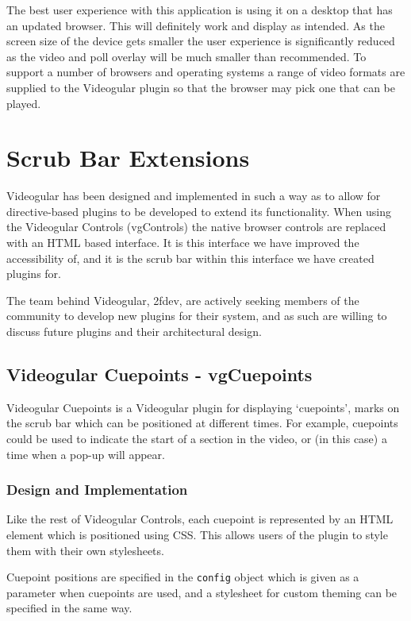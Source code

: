 The best user experience with this application is using it on a desktop that has an updated browser. This will definitely work and display as intended. As the screen size of the device gets smaller the user experience is significantly reduced as the video and poll overlay will be much smaller than recommended. To support a number of browsers and operating systems a range of video formats are supplied to the \gls{Videogular} plugin so that the browser may pick one that can be played.

\section{Scrub Bar Extensions}
\label{Section:Scrub Bar Extensions}

\gls{Videogular} has been designed and implemented in such a way as to allow for directive-based plugins to be developed to extend its functionality. When using the \gls{Videogular} Controls (vgControls) the native browser controls are replaced with an HTML based interface. It is this interface we have improved the accessibility of, and it is the scrub bar within this interface we have created plugins for.

The team behind \gls{Videogular}, 2fdev, are actively seeking members of the community to develop new plugins for their system, and as such are willing to discuss future plugins and their architectural design.

\subsection{Videogular Cuepoints - vgCuepoints}
\label{Subsection:vgCuepoints}
\gls{Videogular} Cuepoints is a \gls{Videogular} plugin for displaying `cuepoints', marks on the scrub bar which can be positioned at different times. For example, cuepoints could be used to indicate the start of a section in the video, or (in this case) a time when a pop-up will appear.

\subsubsection{Design and Implementation}
Like the rest of Videogular Controls, each cuepoint is represented by an HTML element which is positioned using \gls{CSS}. This allows users of the plugin to style them with their own stylesheets.

Cuepoint positions are specified in the \texttt{config} object which is given as a parameter when cuepoints are used, and a stylesheet for custom theming can be specified in the same way.


